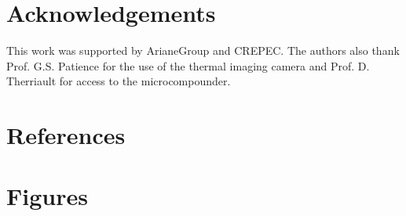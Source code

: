 \documentclass[11pt,review,times]{elsarticle}
\begin{document}
							\section{Acknowledgements}

This work was supported by ArianeGroup and CREPEC. 
The authors also thank Prof. G.S. Patience for the use of the thermal imaging camera and Prof. D. Therriault for access to the microcompounder. 

							\section*{References}





\pagebreak
							\section*{Figures}
\FloatBarrier
\end{document}
